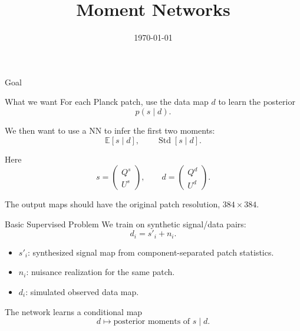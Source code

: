 \documentclass[10pt,aspectratio=169]{beamer}
\title[Moment Networks]{Moment Networks}
\author{}
\date{\today}
\newcommand{\signal}{s}
\newcommand{\data}{d}
\newcommand{\synth}{s'}
\newcommand{\noise}{n}
\begin{document}
\begin{frame}
  \titlepage
\end{frame}

\begin{frame}{Goal}
  \begin{block}{What we want}
    For each Planck patch, use the data map \(\data\) to learn the posterior
    \[
      p(\signal \mid \data).
    \]

    We then want to use a NN to infer the first two moments:
    \[
      \mathbb{E}[\signal \mid \data],
      \qquad
      \operatorname{Std}[\signal \mid \data].
    \]
  \end{block}

  \vspace{0.4em}
  Here
  \[
    \signal =
    \begin{pmatrix}
      Q^{s} \\
      U^{s}
    \end{pmatrix},
    \qquad
    \data =
    \begin{pmatrix}
      Q^{d} \\
      U^{d}
    \end{pmatrix}.
  \]

  The output maps should have the original patch resolution, \(384 \times 384\).
\end{frame}

\begin{frame}{Basic Supervised Problem}
  We train on synthetic signal/data pairs:
  \[
    \data_i = \synth_i + \noise_i.
  \]

  \vspace{0.4em}
  \begin{itemize}
    \item \(\synth_i\): synthesized signal map from component-separated patch statistics.
    \item \(\noise_i\): nuisance realization for the same patch.
    \item \(\data_i\): simulated observed data map.
  \end{itemize}

  \vspace{0.4em}
  The network learns a conditional map
  \[
    \data \longmapsto \text{posterior moments of } \signal \mid \data.
  \]
\end{frame}
\end{document}
